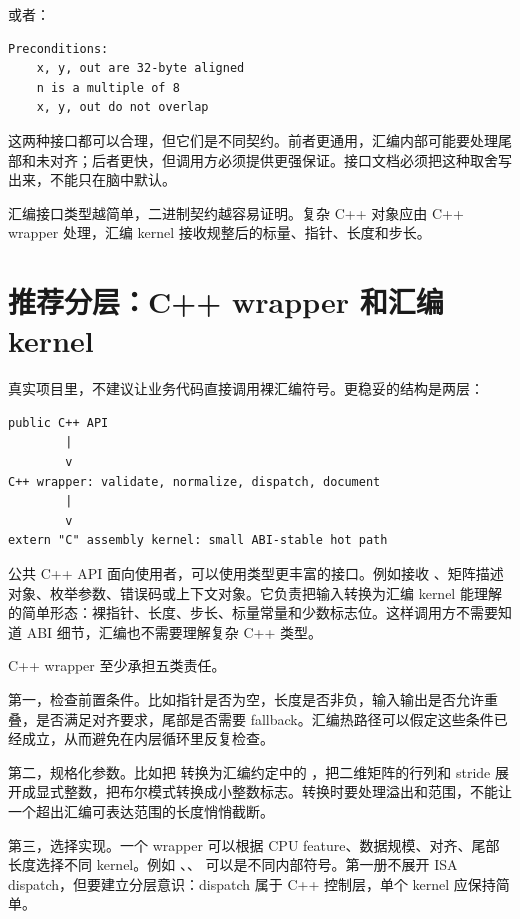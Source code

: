 或者：

\begin{lstlisting}
Preconditions:
    x, y, out are 32-byte aligned
    n is a multiple of 8
    x, y, out do not overlap
\end{lstlisting}

这两种接口都可以合理，但它们是不同契约。前者更通用，汇编内部可能要处理尾部和未对齐；后者更快，但调用方必须提供更强保证。接口文档必须把这种取舍写出来，不能只在脑中默认。

\begin{keyidea}
汇编接口类型越简单，二进制契约越容易证明。复杂 C++ 对象应由 C++ wrapper 处理，汇编 kernel 接收规整后的标量、指针、长度和步长。
\end{keyidea}

\section{推荐分层：C++ wrapper 和汇编 kernel}

真实项目里，不建议让业务代码直接调用裸汇编符号。更稳妥的结构是两层：

\begin{center}
\begin{minipage}{0.84\linewidth}
\begin{verbatim}
public C++ API
        |
        v
C++ wrapper: validate, normalize, dispatch, document
        |
        v
extern "C" assembly kernel: small ABI-stable hot path
\end{verbatim}
\end{minipage}
\end{center}

公共 C++ API 面向使用者，可以使用类型更丰富的接口。例如接收 、矩阵描述对象、枚举参数、错误码或上下文对象。它负责把输入转换为汇编 kernel 能理解的简单形态：裸指针、长度、步长、标量常量和少数标志位。这样调用方不需要知道 ABI 细节，汇编也不需要理解复杂 C++ 类型。

C++ wrapper 至少承担五类责任。

第一，检查前置条件。比如指针是否为空，长度是否非负，输入输出是否允许重叠，是否满足对齐要求，尾部是否需要 fallback。汇编热路径可以假定这些条件已经成立，从而避免在内层循环里反复检查。

第二，规格化参数。比如把  转换为汇编约定中的 ，把二维矩阵的行列和 stride 展开成显式整数，把布尔模式转换成小整数标志。转换时要处理溢出和范围，不能让一个超出汇编可表达范围的长度悄悄截断。

第三，选择实现。一个 wrapper 可以根据 CPU feature、数据规模、对齐、尾部长度选择不同 kernel。例如 、、 可以是不同内部符号。第一册不展开 ISA dispatch，但要建立分层意识：dispatch 属于 C++ 控制层，单个 kernel 应保持简单。

